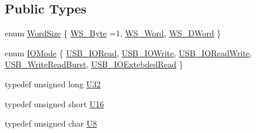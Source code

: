 \subsection*{Public Types}
\begin{DoxyCompactItemize}
\item 
enum \hyperlink{classUsbFTInterface_a057387f452eaac094fb77ba09cf1cf2e}{Word\+Size} \{ \hyperlink{classUsbFTInterface_a057387f452eaac094fb77ba09cf1cf2ea32efe2feb6728578134aa9b85b97d1b9}{W\+S\+\_\+\+Byte} =1, 
\hyperlink{classUsbFTInterface_a057387f452eaac094fb77ba09cf1cf2ea83a39aef091bbcfb420ac32aafe55e0a}{W\+S\+\_\+\+Word}, 
\hyperlink{classUsbFTInterface_a057387f452eaac094fb77ba09cf1cf2eae8012559bbaaae91ac6208ed7b3ffe89}{W\+S\+\_\+\+D\+Word}
 \}
\item 
enum \hyperlink{classUsbFTInterface_ace858cb26e5a7e13f69074fae6bf8f4a}{I\+O\+Mode} \{ \newline
\hyperlink{classUsbFTInterface_ace858cb26e5a7e13f69074fae6bf8f4aab7035362547f3f742c3e4a3ab2c6a80e}{U\+S\+B\+\_\+\+I\+O\+Read}, 
\hyperlink{classUsbFTInterface_ace858cb26e5a7e13f69074fae6bf8f4aa01390a5571f202557191cbff67f80e67}{U\+S\+B\+\_\+\+I\+O\+Write}, 
\hyperlink{classUsbFTInterface_ace858cb26e5a7e13f69074fae6bf8f4aac918e2df35628e6be3d598bdf86d2e15}{U\+S\+B\+\_\+\+I\+O\+Read\+Write}, 
\hyperlink{classUsbFTInterface_ace858cb26e5a7e13f69074fae6bf8f4aafaeca70bd5113bd710b501699f399663}{U\+S\+B\+\_\+\+Write\+Read\+Burst}, 
\newline
\hyperlink{classUsbFTInterface_ace858cb26e5a7e13f69074fae6bf8f4aa5cc7b52e259722b1c9a03d98bd06383c}{U\+S\+B\+\_\+\+I\+O\+Extebded\+Read}
 \}
\item 
typedef unsigned long \hyperlink{classUsbFTInterface_aee2201fe4d977aa03568fa8dbacc39ba}{U32}
\item 
typedef unsigned short \hyperlink{classUsbFTInterface_a51f8cba75a1b8eb42ba2c6ba3841f80f}{U16}
\item 
typedef unsigned char \hyperlink{classUsbFTInterface_a3b007566f8af758984d97ada2b9938d3}{U8}
\end{DoxyCompactItemize}
